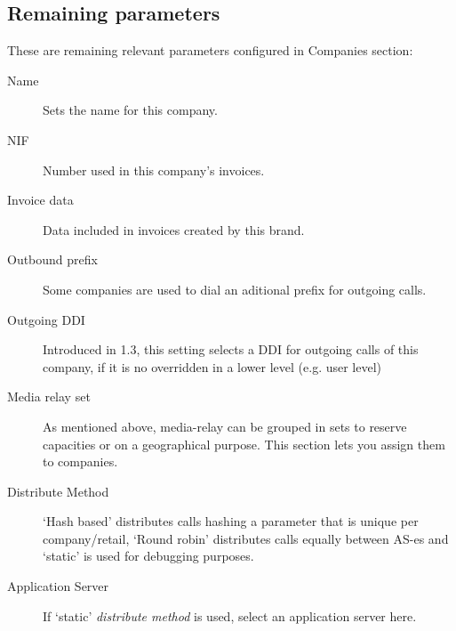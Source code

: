 \documentclass[letterpaper,10pt,english]{sphinxmanual}
\begin{document}
\subsection{Remaining parameters}
\label{internal_calls/brand_portal:remaining-parameters}
These are remaining relevant parameters configured in Companies section:
\begin{description}
\item[{Name}] \leavevmode{}\label{internal_calls/brand_portal:term-name}
Sets the name for this company.

\item[{NIF}] \leavevmode{}\label{internal_calls/brand_portal:term-nif}
Number used in this company's invoices.

\item[{Invoice data}] \leavevmode{}\label{internal_calls/brand_portal:term-invoice-data}
Data included in invoices created by this brand.

\item[{Outbound prefix}] \leavevmode{}\label{internal_calls/brand_portal:term-outbound-prefix}
Some companies are used to dial an aditional prefix for outgoing calls.

\item[{Outgoing DDI}] \leavevmode{}\label{internal_calls/brand_portal:term-outgoing-ddi}
Introduced in 1.3, this setting selects a DDI for outgoing calls
of this company, if it is no overridden in a lower level (e.g. user level)

\item[{Media relay set}] \leavevmode{}\label{internal_calls/brand_portal:term-media-relay-set}
As mentioned above, media-relay can be grouped in sets to reserve capacities
or on a geographical purpose. This section lets you assign them to companies.

\item[{Distribute Method}] \leavevmode{}\label{internal_calls/brand_portal:term-distribute-method}
`Hash based' distributes calls hashing a parameter that is unique per
company/retail, `Round robin' distributes calls equally between AS-es and
`static' is used for debugging purposes.

\item[{Application Server}] \leavevmode{}\label{internal_calls/brand_portal:term-application-server}
If `static' \emph{distribute method} is used, select an application server here.


\end{description}
\end{document}
